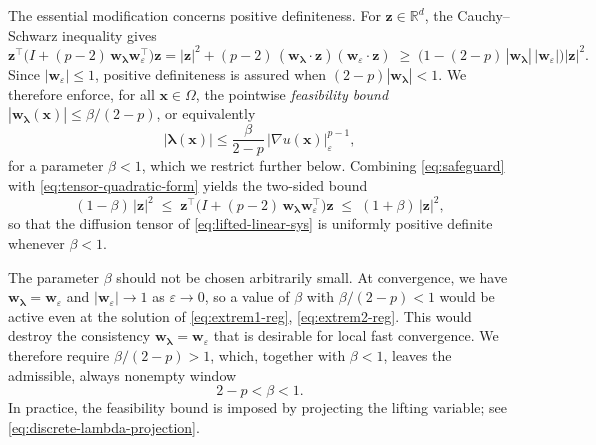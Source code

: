 \documentclass[11pt,pdflatex,sn-mathphys-num]{sn-jnl}
\theoremstyle{thmstyleone}%
\theoremstyle{thmstyletwo}%
\theoremstyle{thmstylethree}%
\newcommand{\bs}[1]{\ensuremath{\boldsymbol{#1}}}
\begin{document}
The essential modification concerns positive definiteness. For $\bs z\in\mathbb R^d$, the Cauchy--Schwarz inequality gives
\begin{equation}\label{eq:tensor-quadratic-form}
  \bs z^\top\bigl(I + (p-2)\,\bs w_{\bs\lambda}\bs w_\varepsilon^\top\bigr)\bs z
  = |\bs z|^2 + (p-2)\,(\bs w_{\bs\lambda}\cdot\bs z)(\bs w_\varepsilon \cdot \bs z)
  \;\ge\; \bigl(1-(2-p)\,|\bs w_{\bs\lambda}|\,|\bs w_\varepsilon|\bigr)|\bs z|^2 .
\end{equation}
Since $|\bs w_\varepsilon|\le 1$, positive definiteness is assured when $(2-p)|\bs w_{\bs\lambda}|<1$. We therefore enforce, for all $\bs x\in\Omega$, the pointwise \emph{feasibility bound} $|\bs w_{\bs\lambda}(\bs x)|\le{\beta}/{(2-p)}$, or equivalently
\begin{equation}\label{eq:safeguard}
  |\bs\lambda(\bs x)|\le\frac{\beta}{2-p}\,|\nabla u(\bs x)|_\varepsilon^{p-1},
\end{equation}
for a parameter $\beta<1$, which we restrict further below. Combining \eqref{eq:safeguard} with \eqref{eq:tensor-quadratic-form} yields the two-sided bound
\begin{equation}\label{eq:tensor-sandwich}
  (1-\beta)\,|\bs z|^2
  \;\le\; \bs z^\top\bigl(I + (p-2)\,\bs w_{\bs\lambda}\bs w_\varepsilon^\top\bigr)\bs z
  \;\le\; (1+\beta)\,|\bs z|^2 ,
\end{equation}
so that the diffusion tensor of \eqref{eq:lifted-linear-sys} is uniformly positive definite whenever $\beta<1$.

The parameter $\beta$ should not be chosen arbitrarily small. At convergence, we have $\bs w_{\bs\lambda}=\bs w_\varepsilon$ and $|\bs w_\varepsilon|
\to 1$ as $\varepsilon\to0$, so a value of $\beta$ with $\beta/(2-p)<1$ would be active even at the solution of \eqref{eq:extrem1-reg}, \eqref{eq:extrem2-reg}. This would %
destroy the consistency $\bs w_{\bs\lambda}=\bs w_\varepsilon$ that is desirable for local fast convergence. We therefore require $\beta/(2-p)>1$, which, together with $\beta<1$, leaves the admissible, always nonempty window
\begin{equation}\label{eq:beta-window}
  2-p<\beta<1.
\end{equation}
In practice, the feasibility bound is imposed by projecting the lifting variable;
see \eqref{eq:discrete-lambda-projection}.
\end{document}
